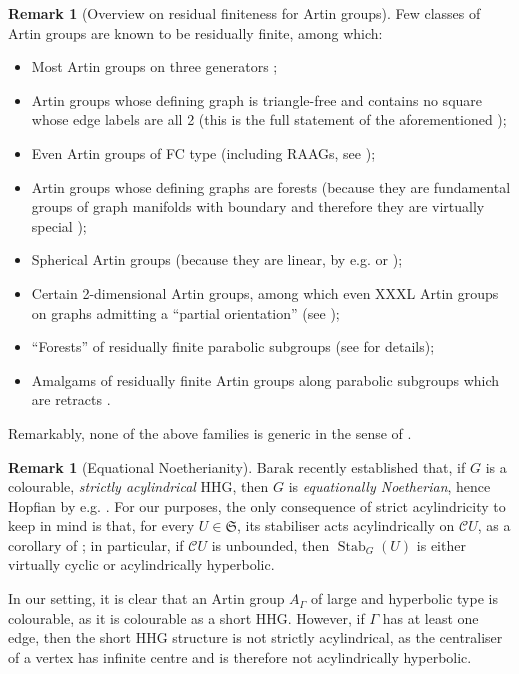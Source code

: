 \documentclass[svgnames]{amsart}
\theoremstyle{plain}
\theoremstyle{definition}
\newtheorem{rem}[thm]{Remark}
\newcommand{\frakS}{\mathfrak S}
\newcommand{\C}{\mathcal C}
\newcommand{\Stab}[2]{\operatorname{Stab}_{#1}(#2)}
\begin{document}
\begin{rem}[Overview on residual finiteness for Artin groups]\label{rmk:resfin}
    Few classes of Artin groups are known to be residually finite, among which:
    \begin{itemize}
        \item Most Artin groups on three generators \cite{Squier_3gen_artin1987,Resfin_2D, Finite_stature_Artin,WuYe_splittings_triangle_Artin2025,Meyer_resfin_triangle_artin};
        \item Artin groups whose defining graph is triangle-free and contains no square whose edge labels are all 2 (this is the full statement of the aforementioned \cite[Theorem G]{goldman20242dimensionalshephardgroups});
        \item Even Artin groups of FC type (including RAAGs, see \cite{eafc_polyfree});
        \item Artin groups whose defining graphs are forests (because they are fundamental groups of graph manifolds with boundary \cite{Brunner1992, HermillerMeier_artin_grps_and_3mfd1999} and therefore they are virtually special \cite{Liu_virtual_cubulation_graph_mfd2013, PrzytyckiWise_graph_mfd_with_boundary_virtspecial2013});
        \item Spherical Artin groups (because they are linear, by e.g. \cite{CohenWales_linear_spherical} or \cite{digne});
        \item Certain 2-dimensional Artin groups, among which even XXXL Artin groups on graphs admitting a “partial orientation” (see \cite{Resfin_2D});
        \item “Forests” of residually finite parabolic subgroups (see \cite{Blascoetal} for details);
        \item Amalgams of residually finite Artin groups along parabolic subgroups which are retracts \cite{BolerEvans_amalgam_along_retract_is_resfin1973}.
    \end{itemize}
    Remarkably, none of the above families is generic in the sense of \cite{GV_random}.
\end{rem}

\begin{rem}[Equational Noetherianity]\label{rem:no_we_cant_barak}
Barak \cite{barak2024equational} recently established that, if $G$ is a colourable,  \emph{strictly acylindrical} HHG, then $G$ is \emph{equationally Noetherian}, hence Hopfian by e.g. \cite[Corollary 3.14 and Theorem D]{Groves_Hull:eq_noetherian}. For our purposes, the only consequence of strict acylindricity to keep in mind is that, for every $U\in \frakS$, its stabiliser acts acylindrically on $\C U$, as a corollary of \cite[Theorem 6.3]{bbfs}; in particular, if $\C U$ is unbounded, then $\Stab{G}U$ is either virtually cyclic or acylindrically hyperbolic.

In our setting, it is clear that an Artin group $A_\Gamma$ of large and hyperbolic type is colourable, as it is colourable as a short HHG. However, if $\Gamma$ has at least one edge, then the short HHG structure is not strictly acylindrical, as the centraliser of a vertex has infinite centre and is therefore not acylindrically hyperbolic.
\end{rem}
\end{document}
